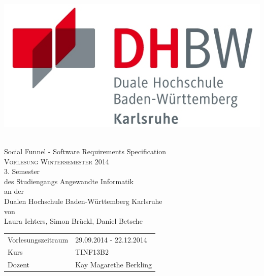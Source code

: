 \begin{titlepage}
	\begin{center}
		\begin{minipage}{0.4\textwidth}
			\begin{flushleft}
				\includegraphics[scale=0.9]{./logos/DHBW}
			\end{flushleft}
		\end{minipage}
		\begin{minipage}{0.4\textwidth}
			\begin{flushright}
			\end{flushright}
		\end{minipage}
		\\[1.5cm]
		{\LARGE Social Funnel - Software Requirements Specification}\\[1.5cm]

		\textsc{\Large Vorlesung Wintersemester 2014}\\[0.5cm]

		3. Semester\\[1.5cm]
		des Studiengangs Angewandte Informatik\\
		an der\\
		Dualen Hochschule Baden-Württemberg Karlsruhe\\[1.5cm]
		von\\
		Laura Ichters, Simon Brückl, Daniel Betsche\\

		\vfill

		\begin{tabular}{l l}
			Vorlesungszeitraum	& 29.09.2014 - 22.12.2014 \\
			Kurs			& TINF13B2 \\
			Dozent		& Kay Magarethe Berkling
		\end{tabular}
	\end{center}
\end{titlepage}

